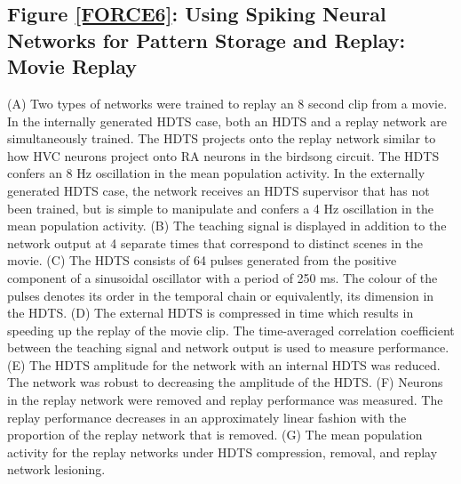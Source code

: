\documentclass[11pt]{article} %
\begin{document}
\subsection*{Figure \ref{FORCE6}: Using Spiking Neural Networks for Pattern Storage and Replay:  Movie Replay} 
(A) Two types of networks were trained to replay an 8 second clip from a movie.  In the internally generated HDTS case, both an HDTS and a replay network are simultaneously trained.  The HDTS projects onto the replay network similar to how HVC neurons project onto RA neurons in the birdsong circuit. The HDTS confers an 8 Hz oscillation in the mean population activity.  In the externally generated HDTS case, the network receives an HDTS supervisor that has not been trained, but is simple to manipulate and confers a 4 Hz oscillation in the mean population activity.  (B) The teaching signal is displayed in addition to the network output at 4 separate times that correspond to distinct scenes in the movie.  (C) The HDTS consists of 64 pulses generated from the positive component of a sinusoidal oscillator with a period of 250 ms.  The colour of the pulses denotes its order in the temporal chain or equivalently, its dimension in the HDTS. (D) The external HDTS is compressed in time which results in speeding up the replay of the movie clip.  The time-averaged correlation coefficient between the teaching signal and network output is used to measure performance.  (E) The HDTS amplitude for the network with an internal HDTS was reduced.  The network was robust to decreasing the amplitude of the HDTS.  (F) Neurons in the replay network were removed and replay performance was measured.  The replay performance decreases in an approximately linear fashion with the proportion of the replay network that is removed.  (G) The mean population activity for the replay networks under HDTS compression, removal, and replay network lesioning.  


\newpage

\end{document}
